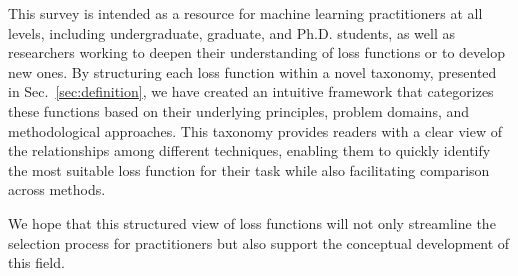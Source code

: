 \documentclass[sn-mathphys-num]{sn-jnl}%
\begin{document}
This survey is intended as a resource for machine learning practitioners at all levels, including undergraduate, graduate, and Ph.D. students, as well as researchers working to deepen their understanding of loss functions or to develop new ones. By structuring each loss function within a novel taxonomy, presented in Sec.~\ref{sec:definition}, we have created an intuitive framework that categorizes these functions based on their underlying principles, problem domains, and methodological approaches. This taxonomy provides readers with a clear view of the relationships among different techniques, enabling them to quickly identify the most suitable loss function for their task while also facilitating comparison across methods.

We hope that this structured view of loss functions will not only streamline the selection process for practitioners but also support the conceptual development of this field.
    


\end{document}
